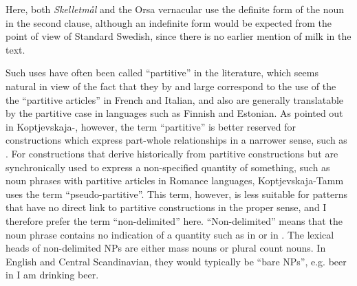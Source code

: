 \ea 
	\z 
\z

Here, both \textit{Skelletmål} and the Orsa vernacular use the definite form of the noun  in the second clause, although an indefinite form would be expected from the point of view of Standard Swedish, since there is no earlier mention of milk in the text. 

Such uses have often been called “partitive” in the literature, which seems natural in view of the fact that they by and large correspond to the use of the the “partitive articles” in French and Italian, and also are generally translatable by the partitive case in languages such as Finnish and Estonian. As pointed out in Koptjevskaja-\citet[525]{Tamm2001}, however, the term “partitive” is better reserved for constructions which express part-whole relationships in a narrower sense, such as . For constructions that derive historically from partitive constructions but are synchronically used to express a non-specified quantity of something, such as noun phrases with partitive articles in Romance languages, Koptjevskaja-Tamm uses the term “pseudo-partitive”. This term, however, is less suitable for patterns that have no direct link to partitive constructions in the proper sense, and I therefore prefer the term “non-delimited” here. “Non-delimited” means that the noun phrase contains no indication of a quantity such as  in or  in . The lexical heads of non-delimited NPs are either mass nouns or plural count nouns. In English and Central Scandinavian, they would typically be “bare NPs”, e.g. beer in I am drinking beer. 

